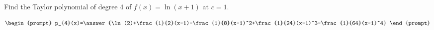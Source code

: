 \documentclass{ximera}
\author{Gregory Hartman \and Matthew Carr}
\begin{document}
\begin{exercise}




Find the Taylor polynomial of degree $4$ of $f(x)=\ln(x+1)$ at $c=1$.

\[
\begin{prompt}
p_{4}(x)=\answer{\ln(2)+\frac{1}{2}(x-1)-\frac{1}{8}(x-1)^2+\frac{1}{24}(x-1)^3-\frac{1}{64}(x-1)^4}
\end{prompt}
\]

\end{exercise}
\end{document}
